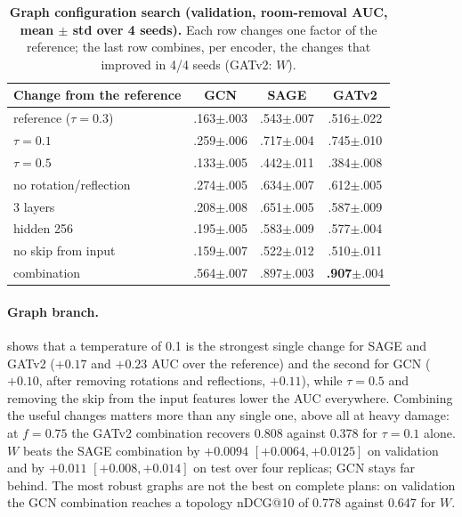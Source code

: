 \begin{table}[t]
  \centering
  \small
  \setlength{\tabcolsep}{4pt}
  \begin{tabular}{@{}lccc@{}}
    \toprule
    Change from the reference & GCN & SAGE & GATv2 \\
    \midrule
    reference ($\tau=0.3$) & .163{\scriptsize$\pm$.003} & .543{\scriptsize$\pm$.007} & .516{\scriptsize$\pm$.022} \\
    $\tau=0.1$ & .259{\scriptsize$\pm$.006} & .717{\scriptsize$\pm$.004} & .745{\scriptsize$\pm$.010} \\
    $\tau=0.5$ & .133{\scriptsize$\pm$.005} & .442{\scriptsize$\pm$.011} & .384{\scriptsize$\pm$.008} \\
    no rotation/reflection & .274{\scriptsize$\pm$.005} & .634{\scriptsize$\pm$.007} & .612{\scriptsize$\pm$.005} \\
    3 layers & .208{\scriptsize$\pm$.008} & .651{\scriptsize$\pm$.005} & .587{\scriptsize$\pm$.009} \\
    hidden 256 & .195{\scriptsize$\pm$.005} & .583{\scriptsize$\pm$.009} & .577{\scriptsize$\pm$.004} \\
    no skip from input & .159{\scriptsize$\pm$.007} & .522{\scriptsize$\pm$.012} & .510{\scriptsize$\pm$.011} \\
    \midrule
    combination & .564{\scriptsize$\pm$.007} & .897{\scriptsize$\pm$.003} & \textbf{.907}{\scriptsize$\pm$.004} \\
    \bottomrule
  \end{tabular}
  \caption{\textbf{Graph configuration search (validation, room-removal AUC, mean $\pm$ std over 4 seeds).}
  Each row changes one factor of the reference; the last row combines, per encoder, the changes that improved in 4/4 seeds (GATv2: $W$).}
  \label{tab:ablation_graph}
\end{table}


\paragraph{Graph branch.}
 shows that a temperature of 0.1 is the strongest single change for SAGE and GATv2 ($+0.17$ and $+0.23$ AUC over the reference) and the second for GCN ($+0.10$, after removing rotations and reflections, $+0.11$), while $\tau=0.5$ and removing the skip from the input features lower the AUC everywhere.
Combining the useful changes matters more than any single one, above all at heavy damage: at $f=0.75$ the GATv2 combination recovers 0.808 against 0.378 for $\tau=0.1$ alone.
$W$ beats the SAGE combination by $+0.0094$ $[+0.0064, +0.0125]$ on validation and by $+0.011$ $[+0.008, +0.014]$ on test over four replicas; GCN stays far behind.
The most robust graphs are not the best on complete plans: on validation the GCN combination reaches a topology nDCG@10 of 0.778 against 0.647 for $W$.

